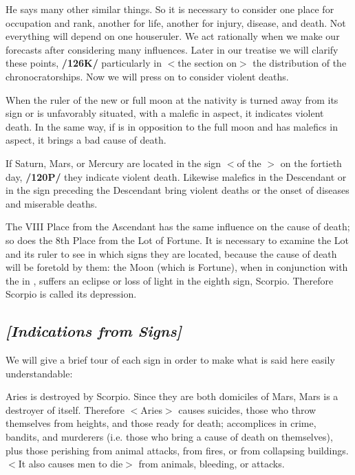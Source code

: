He says many other similar things. So it is necessary to consider one place for occupation and rank, another for life, another for injury, disease, and death. Not everything will depend on one houseruler. We act rationally when we make our forecasts after considering many influences. Later in our treatise we will clarify these points, \textbf{/126K/} particularly in $<$the section on$>$ the distribution of the chronocratorships. Now we will press on to consider violent deaths. 

When the ruler of the new or full moon at the nativity is turned away from its sign or is unfavorably situated, with a malefic in aspect, it indicates violent death. In the same way, if \Mercury\xspace is in opposition to the full moon and has malefics in aspect, it brings a bad cause of death. 

If Saturn, Mars, or Mercury are located in the sign $<$of the \Moon$>$ on the fortieth day, \textbf{/120P/} they indicate violent death. Likewise malefics in the Descendant or
in the sign preceding the Descendant bring violent deaths or the onset of diseases and miserable deaths.

The VIII Place from the Ascendant has the same influence on the cause of death; so does the 8th Place from the Lot of Fortune. It is necessary to examine the Lot and its ruler to see in which signs they are located, because the cause of death will be foretold by them: the Moon (which is Fortune), when in conjunction with the \Sun\xspace in \Aries, suffers an eclipse or loss of light in the eighth sign, Scorpio. Therefore Scorpio is called its depression.

\subsection{\textit{[Indications from Signs]}}
We will give a brief tour of each sign in order to make what is said here easily understandable:

Aries \mn{\Aries} is destroyed by Scorpio. Since they are both domiciles of Mars, Mars is a destroyer of itself. Therefore $<$Aries$>$ causes suicides, those who throw themselves from heights, and those ready for death;
accomplices in crime, bandits, and murderers (i.e. those who bring a cause of death on themselves), plus those perishing from animal attacks, from fires, or from collapsing buildings. $<$It also causes men to die$>$ from animals, bleeding, or attacks.


